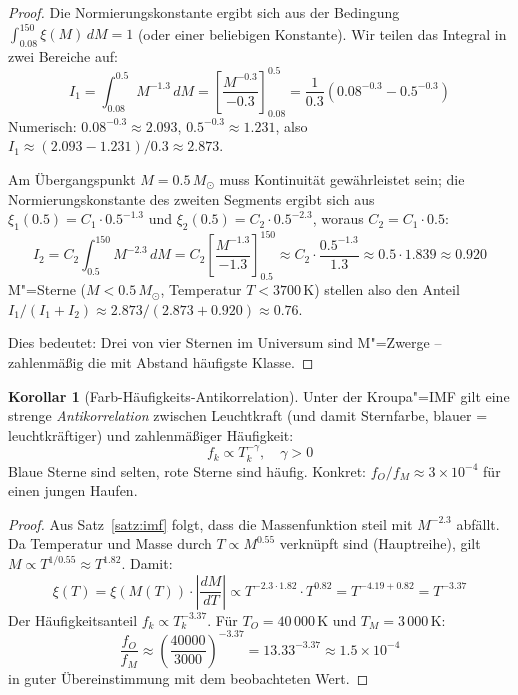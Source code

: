 ﻿\documentclass[a4paper,12pt]{article}
\theoremstyle{definition}
\newtheorem{korollar}{Korollar}
\begin{document}
\begin{proof}
    Die Normierungskonstante ergibt sich aus der Bedingung
    $\int_{0.08}^{150} \xi(M)\,dM = 1$ (oder einer beliebigen Konstante).
    Wir teilen das Integral in zwei Bereiche auf:
    \[
        I_1 = \int_{0.08}^{0.5} M^{-1.3}\,dM
        = \left[\frac{M^{-0.3}}{-0.3}\right]_{0.08}^{0.5}
        = \frac{1}{0.3}\left(0.08^{-0.3} - 0.5^{-0.3}\right)
    \]
    Numerisch: $0.08^{-0.3} \approx 2.093$, $0.5^{-0.3} \approx 1.231$,
    also $I_1 \approx (2.093 - 1.231)/0.3 \approx 2.873$.

    Am Übergangspunkt $M = 0.5\,M_\odot$ muss Kontinuität gewährleistet sein;
    die Normierungskonstante des zweiten Segments ergibt sich aus
    $\xi_1(0.5) = C_1 \cdot 0.5^{-1.3}$ und
    $\xi_2(0.5) = C_2 \cdot 0.5^{-2.3}$, woraus $C_2 = C_1 \cdot 0.5$:
    \[
        I_2 = C_2\int_{0.5}^{150} M^{-2.3}\,dM
        = C_2 \left[\frac{M^{-1.3}}{-1.3}\right]_{0.5}^{150}
        \approx C_2 \cdot \frac{0.5^{-1.3}}{1.3} \approx 0.5 \cdot 1.839
        \approx 0.920
    \]
    M"=Sterne ($M < 0.5\,M_\odot$, Temperatur $T < 3700\,\text{K}$) stellen
    also den Anteil $I_1 / (I_1 + I_2) \approx 2.873 / (2.873+0.920) \approx 0.76$.

    Dies bedeutet: Drei von vier Sternen im Universum sind M"=Zwerge --
    zahlenmäßig die mit Abstand häufigste Klasse. \qedhere
\end{proof}

\begin{korollar}[Farb-Häufigkeits-Antikorrelation]
\label{kor:antikorr}
    Unter der Kroupa"=IMF gilt eine strenge \emph{Antikorrelation} zwischen
    Leuchtkraft (und damit Sternfarbe, blauer = leuchtkräftiger) und
    zahlenmäßiger Häufigkeit:
    \[
        f_k \propto T_k^{-\gamma}, \quad \gamma > 0
    \]
    Blaue Sterne sind selten, rote Sterne sind häufig. Konkret:
    $f_O / f_M \approx 3 \times 10^{-4}$ für einen jungen Haufen.
\end{korollar}

\begin{proof}
    Aus Satz~\ref{satz:imf} folgt, dass die Massenfunktion steil mit
    $M^{-2.3}$ abfällt. Da Temperatur und Masse durch $T \propto M^{0.55}$
    verknüpft sind (Hauptreihe), gilt $M \propto T^{1/0.55} \approx T^{1.82}$.
    Damit:
    \[
        \xi(T) = \xi(M(T)) \cdot \left|\frac{dM}{dT}\right|
        \propto T^{-2.3 \cdot 1.82} \cdot T^{0.82}
        = T^{-4.19 + 0.82} = T^{-3.37}
    \]
    Der Häufigkeitsanteil $f_k \propto T_k^{-3.37}$. Für
    $T_O = 40\,000\,\text{K}$ und $T_M = 3\,000\,\text{K}$:
    \[
        \frac{f_O}{f_M} \approx \left(\frac{40000}{3000}\right)^{-3.37}
        = 13.33^{-3.37} \approx 1.5 \times 10^{-4}
    \]
    in guter Übereinstimmung mit dem beobachteten Wert. \qedhere
\end{proof}
\end{document}
